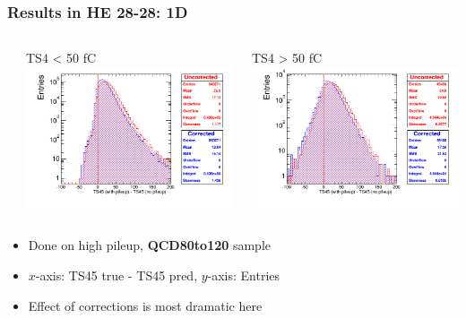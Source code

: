 \documentclass[bigger]{beamer}
\providecommand{\alert}[1]{\textbf{#1}}
\begin{document}
\begin{frame}
\frametitle{Results in HE 28-28: 1D}
\label{sec-3-3-23}
\begin{columns} %
\label{sec-3-3-23-1}
\begin{column}{0.55\textwidth}
\label{sec-3-3-23-1-1}

\centering
TS4 < 50 fC
\includegraphics[width=\textwidth]{fig/correction_comparison_1D_sample80to120_under50_ring5.png}
\end{column}
\begin{column}{0.55\textwidth}
\label{sec-3-3-23-1-2}

\centering
TS4 > 50 fC
\includegraphics[width=\textwidth]{fig/correction_comparison_1D_sample80to120_over50_ring5.png}
\end{column}
\end{columns}
\label{sec-3-3-23-2}
\begin{itemize}

\item Done on high pileup, \alert{QCD80to120} sample
\label{sec-3-3-23-2-1}%

\item $x$-axis: TS45 true - TS45 pred, $y$-axis: Entries
\label{sec-3-3-23-2-2}%

\item Effect of corrections is most dramatic here
\label{sec-3-3-23-2-3}%
\end{itemize} %
\end{frame}
\end{document}
